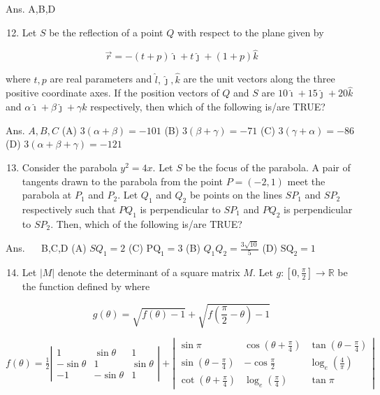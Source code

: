 \documentclass[10pt]{article}
\begin{document}
Ans. A,B,D

\begin{enumerate}
  \setcounter{enumi}{11}
  \item Let $S$ be the reflection of a point $Q$ with respect to the plane given by
\end{enumerate}

$$
\vec{r}=-(t+p) \hat{\imath}+t \hat{\jmath}+(1+p) \hat{k}
$$

where $t, p$ are real parameters and $\hat{l}, \hat{\jmath}, \hat{k}$ are the unit vectors along the three positive coordinate axes. If the position vectors of $Q$ and $S$ are $10 \hat{\imath}+15 \hat{\jmath}+20 \hat{k}$ and $\alpha \hat{\imath}+\beta \hat{\jmath}+\gamma \hat{k}$ respectively, then which of the following is/are TRUE?

Ans. $A, B, C$
(A) $3(\alpha+\beta)=-101$
(B) $3(\beta+\gamma)=-71$
(C) $3(\gamma+\alpha)=-86$
(D) $3(\alpha+\beta+\gamma)=-121$

\begin{enumerate}
  \setcounter{enumi}{12}
  \item Consider the parabola $y^{2}=4 x$. Let $S$ be the focus of the parabola. A pair of tangents drawn to the parabola from the point $P=(-2,1)$ meet the parabola at $P_{1}$ and $P_{2}$. Let $Q_{1}$ and $Q_{2}$ be points on the lines $S P_{1}$ and $S P_{2}$ respectively such that $P Q_{1}$ is perpendicular to $S P_{1}$ and $P Q_{2}$ is perpendicular to $S P_{2}$. Then, which of the following is/are TRUE?
\end{enumerate}

Ans. $\quad$ B,C,D
(A) $S Q_{1}=2$
(C) $\mathrm{PQ}_{1}=3$
(B) $Q_{1} Q_{2}=\frac{3 \sqrt{10}}{5}$
(D) $\mathrm{SQ}_{2}=1$

\begin{enumerate}
  \setcounter{enumi}{13}
  \item Let $|M|$ denote the determinant of a square matrix $M$. Let $g:\left[0, \frac{\pi}{2}\right] \rightarrow \mathbb{R}$ be the function defined by where
\end{enumerate}

$$
g(\theta)=\sqrt{f(\theta)-1}+\sqrt{f\left(\frac{\pi}{2}-\theta\right)-1}
$$

$f(\theta)=\frac{1}{2}\left|\begin{array}{ccc}1 & \sin \theta & 1 \\ -\sin \theta & 1 & \sin \theta \\ -1 & -\sin \theta & 1\end{array}\right|+\left|\begin{array}{ccc}\sin \pi & \cos \left(\theta+\frac{\pi}{4}\right) & \tan \left(\theta-\frac{\pi}{4}\right) \\ \sin \left(\theta-\frac{\pi}{4}\right) & -\cos \frac{\pi}{2} & \log _{e}\left(\frac{4}{\pi}\right) \\ \cot \left(\theta+\frac{\pi}{4}\right) & \log _{e}\left(\frac{\pi}{4}\right) & \tan \pi\end{array}\right|$
\end{document}
